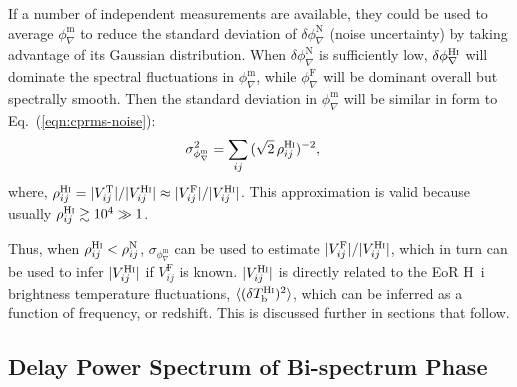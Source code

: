 \documentclass[
reprint,
superscriptaddress,
amsmath,
amssymb,
aps,
prd
]{revtex4-1}
\begin{document}
If a number of independent measurements are available, they could be used to average $\phi_\nabla^\textrm{m}$ to reduce the standard deviation of $\delta\phi_\nabla^\textrm{N}$ (noise uncertainty) by taking advantage of its Gaussian distribution. When $\delta\phi_\nabla^\textrm{N}$ is sufficiently low, $\delta\phi_\nabla^\textrm{H{\sc i}}$ will dominate the spectral fluctuations in $\phi_\nabla^\textrm{m}$, while $\phi_\nabla^\textrm{F}$ will be dominant overall but spectrally smooth. Then the standard deviation in $\phi_\nabla^\textrm{m}$ will be similar in form to Eq.~(\ref{eqn:cprms-noise}):
\begin{align}
  \sigma_{\phi_\nabla^\textrm{m}}^2 &= \sum_{ij}\, (\sqrt{2}\,\rho_{ij}^\textrm{H{\sc i}})^{-2}, \label{eqn:cprms-EoR}
\end{align}
where, $\rho_{ij}^\textrm{H{\sc i}} = |V_{ij}^\textrm{T}|/|V_{ij}^\textrm{H{\sc i}}| \approx |V_{ij}^\textrm{F}|/|V_{ij}^\textrm{H{\sc i}}|$. This approximation is valid because usually $\rho_{ij}^\textrm{H{\sc i}} \gtrsim 10^4 \gg 1$. 

Thus, when $\rho_{ij}^\textrm{H{\sc i}} < \rho_{ij}^\textrm{N}$, $\sigma_{\phi_\nabla^\textrm{m}}$ can be used to estimate $|V_{ij}^\textrm{F}|/|V_{ij}^\textrm{H{\sc i}}|$, which in turn can be used to infer $|V_{ij}^\textrm{H{\sc i}}|$ if $V_{ij}^\textrm{F}$ is known. $|V_{ij}^\textrm{H{\sc i}}|$ is directly related to the EoR H~{\sc i} brightness temperature fluctuations, $\langle(\delta T_\textrm{b}^\textrm{H{\sc i}})^2\rangle$, which can be inferred as a function of frequency, or redshift. This is discussed further in sections that follow. %


\subsection{Delay Power Spectrum of Bi-spectrum Phase}\label{sec:cp-FG-wedge}
\end{document}
